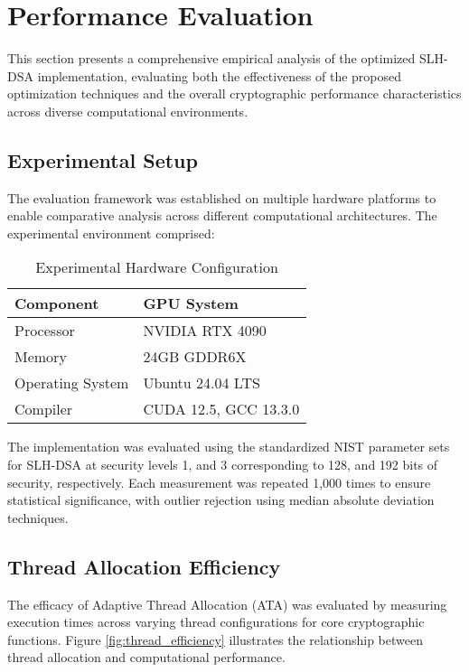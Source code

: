 \documentclass[journal]{IEEEtran}
\begin{document}
\section{Performance Evaluation}\label{sec:evaluation}

This section presents a comprehensive empirical analysis of the optimized SLH-DSA implementation, evaluating both the effectiveness of the proposed optimization techniques and the overall cryptographic performance characteristics across diverse computational environments.

\subsection{Experimental Setup}

The evaluation framework was established on multiple hardware platforms to enable comparative analysis across different computational architectures. The experimental environment comprised:

\begin{table}[h]
  \centering
  \caption{Experimental Hardware Configuration}
  \label{tab:hardware_config}
  \begin{tabular}{@{}ll@{}}
    \toprule
    \textbf{Component} & \textbf{GPU System} \\
    \midrule
    Processor & NVIDIA RTX 4090 \\
    Memory & 24GB GDDR6X \\
    Operating System & Ubuntu 24.04 LTS \\
    Compiler & CUDA 12.5, GCC 13.3.0 \\
    \bottomrule
  \end{tabular}
\end{table}

The implementation was evaluated using the standardized NIST parameter sets for SLH-DSA at security levels 1, and 3 corresponding to 128, and 192 bits of security, respectively. Each measurement was repeated 1,000 times to ensure statistical significance, with outlier rejection using median absolute deviation techniques.

\subsection{Thread Allocation Efficiency}

The efficacy of Adaptive Thread Allocation (ATA) was evaluated by measuring execution times across varying thread configurations for core cryptographic functions. Figure \ref{fig:thread_efficiency} illustrates the relationship between thread allocation and computational performance.
\end{document}
